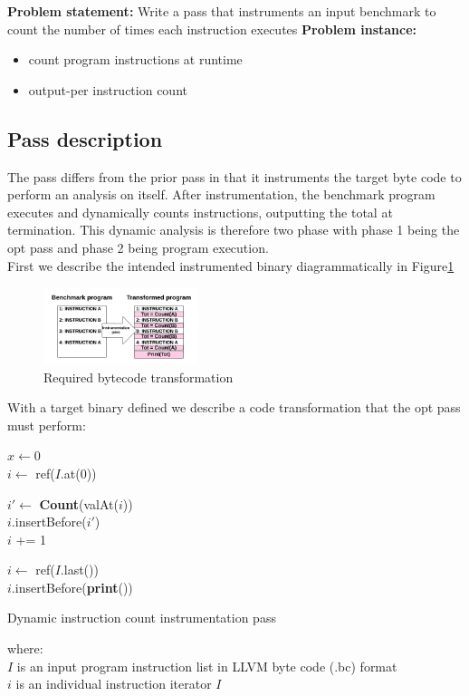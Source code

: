 \textbf{Problem statement: }Write a pass that instruments an input benchmark to count the number of times each instruction executes
\textbf{Problem instance: }
\begin{itemize}
\item count program instructions at runtime
\item output-per instruction count
\end{itemize}

\subsection{Pass description}
The pass differs from the prior pass in that it instruments the target byte code to perform an analysis on itself. After instrumentation, the benchmark program executes and dynamically counts instructions, outputting the total at termination. This dynamic analysis is therefore two phase with phase 1 being the opt pass and phase 2 being program execution.\\
First we describe the intended instrumented binary diagrammatically in Figure\ref{Part2transform}\\

\begin{figure}[here]
\includegraphics[width=0.4\textwidth]{CompilersProj1Part2Diag.png}
\caption{Required bytecode transformation}
\label{Part2transform}
\end{figure}

With a target binary defined we describe a code transformation that the opt pass must perform:
\begin{algorithm}
 $x \gets 0$\\
 $i \gets$ ref($I$.at(0)) \\
 { 
 	
 	$i' \gets$ \textbf{Count}(valAt($i$))\\ 
 	$i$.insertBefore($i'$)\\
 	$i$ += 1\\
 }
 $i \gets$ ref($I$.last())\\
 $i$.insertBefore(\textbf{print}())

 \caption{Dynamic instruction count instrumentation pass}
\end{algorithm}
where:\\
$I$ is an input program instruction list in LLVM byte code (.bc) format\\
$i$ is an individual instruction iterator $I$\\

